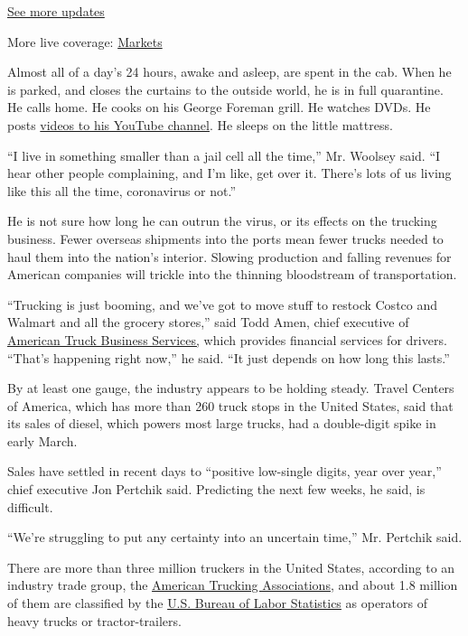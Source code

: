 \href{https://www.nytimes3xbfgragh.onion/2020/09/11/world/covid-19-coronavirus.html?action=click\&pgtype=Article\&state=default\&region=MAIN_CONTENT_1\&context=storylines_live_updates}{See
more updates}

More live coverage:
\href{https://www.nytimes3xbfgragh.onion/live/2020/09/11/business/stock-market-today-coronavirus?action=click\&pgtype=Article\&state=default\&region=MAIN_CONTENT_1\&context=storylines_live_updates}{Markets}

Almost all of a day's 24 hours, awake and asleep, are spent in the cab.
When he is parked, and closes the curtains to the outside world, he is
in full quarantine. He calls home. He cooks on his George Foreman grill.
He watches DVDs. He posts
\href{https://www.youtube.com/channel/UCYS35akf4CO2BP-iw70caKA}{videos
to his YouTube channel}. He sleeps on the little mattress.

``I live in something smaller than a jail cell all the time,'' Mr.
Woolsey said. ``I hear other people complaining, and I'm like, get over
it. There's lots of us living like this all the time, coronavirus or
not.''

He is not sure how long he can outrun the virus, or its effects on the
trucking business. Fewer overseas shipments into the ports mean fewer
trucks needed to haul them into the nation's interior. Slowing
production and falling revenues for American companies will trickle into
the thinning bloodstream of transportation.

``Trucking is just booming, and we've got to move stuff to restock
Costco and Walmart and all the grocery stores,'' said Todd Amen, chief
executive of \href{https://www.atbs.com/about-us}{American Truck
Business Services,} which provides financial services for drivers.
``That's happening right now,'' he said. ``It just depends on how long
this lasts.''

By at least one gauge, the industry appears to be holding steady. Travel
Centers of America, which has more than 260 truck stops in the United
States, said that its sales of diesel, which powers most large trucks,
had a double-digit spike in early March.

Sales have settled in recent days to ``positive low-single digits, year
over year,'' chief executive Jon Pertchik said. Predicting the next few
weeks, he said, is difficult.

``We're struggling to put any certainty into an uncertain time,'' Mr.
Pertchik said.

There are more than three million truckers in the United States,
according to an industry trade group, the
\href{https://www.trucking.org/economics-and-industry-data}{American
Trucking Associations}, and about 1.8 million of them are classified by
the \href{https://www.bls.gov/oes/current/oes533032.htm}{U.S. Bureau of
Labor Statistics} as operators of heavy trucks or tractor-trailers.

